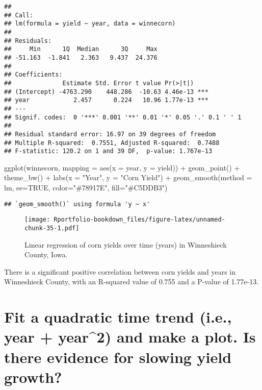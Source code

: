 \documentclass[
]{book}
\newenvironment{Shaded}{\begin{snugshade}}{\end{snugshade}}
\newcommand{\AttributeTok}[1]{\textcolor[rgb]{0.77,0.63,0.00}{#1}}
\newcommand{\ConstantTok}[1]{\textcolor[rgb]{0.00,0.00,0.00}{#1}}
\newcommand{\FunctionTok}[1]{\textcolor[rgb]{0.00,0.00,0.00}{#1}}
\newcommand{\NormalTok}[1]{#1}
\newcommand{\SpecialCharTok}[1]{\textcolor[rgb]{0.00,0.00,0.00}{#1}}
\newcommand{\StringTok}[1]{\textcolor[rgb]{0.31,0.60,0.02}{#1}}
\begin{document}
\begin{verbatim}
## 
## Call:
## lm(formula = yield ~ year, data = winnecorn)
## 
## Residuals:
##     Min      1Q  Median      3Q     Max 
## -51.163  -1.841   2.363   9.437  24.376 
## 
## Coefficients:
##              Estimate Std. Error t value Pr(>|t|)    
## (Intercept) -4763.290    448.286  -10.63 4.46e-13 ***
## year            2.457      0.224   10.96 1.77e-13 ***
## ---
## Signif. codes:  0 '***' 0.001 '**' 0.01 '*' 0.05 '.' 0.1 ' ' 1
## 
## Residual standard error: 16.97 on 39 degrees of freedom
## Multiple R-squared:  0.7551, Adjusted R-squared:  0.7488 
## F-statistic: 120.2 on 1 and 39 DF,  p-value: 1.767e-13
\end{verbatim}

\begin{Shaded}
\begin{Highlighting}[]
\FunctionTok{ggplot}\NormalTok{(winnecorn, }\AttributeTok{mapping =} \FunctionTok{aes}\NormalTok{(}\AttributeTok{x =}\NormalTok{ year, }\AttributeTok{y =}\NormalTok{ yield)) }\SpecialCharTok{+}
  \FunctionTok{geom\_point}\NormalTok{() }\SpecialCharTok{+}
  \FunctionTok{theme\_bw}\NormalTok{() }\SpecialCharTok{+}
  \FunctionTok{labs}\NormalTok{(}\AttributeTok{x =} \StringTok{"Year"}\NormalTok{, }\AttributeTok{y =} \StringTok{"Corn Yield"}\NormalTok{) }\SpecialCharTok{+}
  \FunctionTok{geom\_smooth}\NormalTok{(}\AttributeTok{method =}\NormalTok{ lm, }\AttributeTok{se=}\ConstantTok{TRUE}\NormalTok{, }\AttributeTok{color=}\StringTok{"\#78917E"}\NormalTok{, }\AttributeTok{fill=}\StringTok{"\#C5DDB3"}\NormalTok{)}
\end{Highlighting}
\end{Shaded}

\begin{verbatim}
## `geom_smooth()` using formula 'y ~ x'
\end{verbatim}

\begin{figure}
\centering
\texttt{[image: Rportfolio-bookdown\_files/figure-latex/unnamed-chunk-35-1.pdf]}
\caption{\label{fig:unnamed-chunk-35}Linear regression of corn yields over time (years) in Winneshieck County, Iowa.}
\end{figure}

There is a significant positive correlation between corn yields and years in Winneshieck County, with an R-squared value of 0.755 and a P-value of 1.77e-13.

\hypertarget{fit-a-quadratic-time-trend-i.e.-year-year2-and-make-a-plot.-is-there-evidence-for-slowing-yield-growth}{%
\section{Fit a quadratic time trend (i.e., year + year\^{}2) and make a plot. Is there evidence for slowing yield growth?}\label{fit-a-quadratic-time-trend-i.e.-year-year2-and-make-a-plot.-is-there-evidence-for-slowing-yield-growth}}
\end{document}
